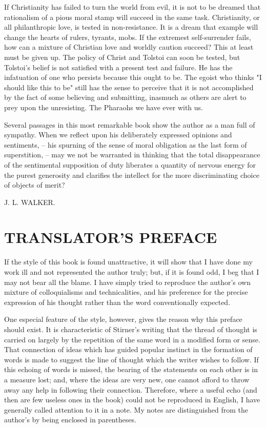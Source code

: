 \documentclass[a4paper]{book}
\begin{document}
If Christianity has failed to turn the world from evil, it is not to be 
dreamed that rationalism of a pious moral stamp will succeed in the same task. 
Christianity, or all philanthropic love, is tested in non-resistance. It is a 
dream that example will change the hearts of rulers, tyrants, mobs. If the 
extremest self-surrender fails, how can a mixture of Christian love and 
worldly caution succeed? This at least must be given up. The policy of Christ 
and Tolstoi can soon be tested, but Tolstoi's belief is not satisfied with a 
present test and failure. He has the infatuation of one who persists because 
this ought to be. The egoist who thinks "{}I should like this to be"{} still 
has the sense to perceive that it is not accomplished by the fact of some 
believing and submitting, inasmuch as others are alert to prey upon the 
unresisting. The Pharaohs we have ever with us.

Several passages in this most remarkable book show the author as a man full of 
sympathy. When we reflect upon his deliberately expressed opinions and 
sentiments, -- his spurning of the sense of moral obligation as the last form 
of superstition, -- may we not be warranted in thinking that the total 
disappearance of the sentimental supposition of duty liberates a quantity of 
nervous energy for the purest generosity and clarifies the intellect for the 
more discriminating choice of objects of merit?

\begin{flushright}
J. L. WALKER.\end{flushright}

\chapter[Translator's Preface]{\centering TRANSLATOR'S PREFACE}

If the style of this book is found unattractive, it will show that I have done 
my work ill and not represented the author truly; but, if it is found odd, I 
beg that I may not bear all the blame. I have simply tried to reproduce the 
author's own mixture of colloquialisms and technicalities, and his preference 
for the precise expression of his thought rather than the word conventionally 
expected.

One especial feature of the style, however, gives the reason why this preface 
should exist. It is characteristic of Stirner's writing that the thread of 
thought is carried on largely by the repetition of the same word in a modified 
form or sense. That connection of ideas which has guided popular instinct in 
the formation of words is made to suggest the line of thought which the writer 
wishes to follow. If this echoing of words is missed, the bearing of the 
statements on each other is in a measure lost; and, where the ideas are very 
new, one cannot afford to throw away any help in following their connection. 
Therefore, where a useful echo (and then are few useless ones in the book) 
could not be reproduced in English, I have generally called attention to it in 
a note. My notes are distinguished from the author's by being enclosed in 
parentheses.
\end{document}
